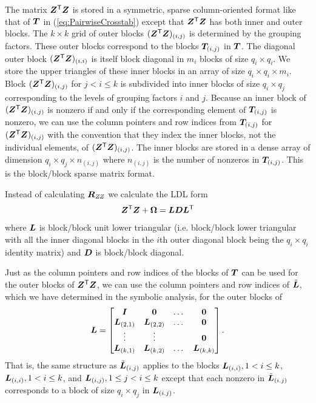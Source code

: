 \documentclass[12pt]{article}
\begin{document}
The matrix $\bm{Z}^\mathsf{T}\bm{Z}$ is stored in a symmetric, sparse
column-oriented format like that of $\bm{T}$ in
(\ref{eq:PairwiseCrosstab}) except that $\bm{Z}^\mathsf{T}\bm{Z}$ has both inner
and outer blocks.  The $k\times k$ grid of outer blocks
$(\bm{Z}^\mathsf{T}\bm{Z})_{(i,j)}$ is determined by the grouping factors.  These
outer blocks correspond to the blocks $\bm{T}_{(i,j)}$ in $\bm{T}$.  The
diagonal outer block $(\bm{Z}^\mathsf{T}\bm{Z})_{(i,i)}$ is itself block diagonal
in $m_i$ blocks of size $q_i\times q_i$.  We store the upper triangles
of these inner blocks in an array of size $q_i\times q_i\times m_i$.
Block $(\bm{Z}^\mathsf{T}\bm{Z})_{(i,j)}$ for $j<i\le k$ is subdivided into inner
blocks of size $q_i\times q_j$ corresponding to the levels of grouping
factors $i$ and $j$.  Because an inner block of
$(\bm{Z}^\mathsf{T}\bm{Z})_{(i,j)}$ is nonzero if and only if the corresponding
element of $\bm{T}_{(i,j)}$ is nonzero, we can use the column pointers
and row indices from $\bm{T}_{(i,j)}$ for $(\bm{Z}^\mathsf{T}\bm{Z})_{(i,j)}$ with
the convention that they index the inner blocks, not the individual
elements, of $(\bm{Z}^\mathsf{T}\bm{Z})_{(i,j)}$.  The inner blocks are stored in
a dense array of dimension $q_i\times q_j\times n_{(i,j)}$ where
$n_{(i,j)}$ is the number of nonzeros in $\bm{T}_{(i,j)}$.  This is the
block/block sparse matrix format.

Instead of calculating $\bm{R}_\mathit{ZZ}$ we calculate the LDL form
\begin{equation}
  \label{eq:bigLDL}
  \bm{Z}^\mathsf{T}\bm{Z}+\bm{\Omega}=\bm{L}\bm{D}\bm{L}^\mathsf{T}
\end{equation}
where $\bm{L}$ is block/block unit lower triangular (i.e.{} block/block lower
triangular with all the inner diagonal blocks in the $i$th outer
diagonal block being the $q_i\times q_i$ identity matrix) and $\bm{D}$ is
block/block diagonal.

Just as the column pointers and row indices of the blocks of $\bm{T}$ can
be used for the outer blocks of $\bm{Z}^\mathsf{T}\bm{Z}$, we can use the column
pointers and row indices of $\tilde{\bm{L}}$, which we have determined in the
symbolic analysis, for the outer blocks of
\begin{equation}
  \label{eq:Lform}
  \bm{L}=
  \begin{bmatrix}
    \bm{I} & \bm{0} & \dots & \bm{0}\\
    \bm{L}_{(2,1)} & \bm{L}_{(2,2)} & \dots & \bm{0}\\
    \vdots    & \vdots & & \bm{0}\\
    \bm{L}_{(k,1)} & \bm{L}_{(k,2)} & \dots & \bm{L}_{(k,k)}
  \end{bmatrix} .
\end{equation}
That is, the same structure as $\tilde{\bm{L}}_{(i,j)}$
applies to the blocks $\bm{L}_{(i,i)}, 1<i\le k$, $\bm{L}_{(i,i)}, 1<i\le k$,
and $\bm{L}_{(i,j)}, 1\le j<i\le k$ except that each nonzero in
$\tilde{\bm{L}}_{(i.j)}$ corresponds to a block of size $q_i\times q_j$ in
$\bm{L}_{(i.j)}$.
\end{document}
